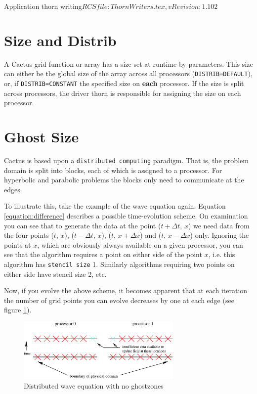 \begin{cactuspart}{2}{Application thorn writing}{$RCSfile: ThornWriters.tex,v $}{$Revision: 1.102 $}
\section{Size and Distrib}

A Cactus grid function or array has a size set at runtime by parameters.
This size can either be the global size of the array across all processors
({\tt DISTRIB=DEFAULT}),
or, if {\tt DISTRIB=CONSTANT} the specified
size on {\bf each} processor.
If the size is split across processors, the driver thorn is
responsible for assigning the size on each processor.

\section{Ghost Size}

Cactus is based upon a {\tt distributed computing} paradigm.  That is,
the problem domain is split into blocks, each of which is assigned to
a processor.  For hyperbolic and parabolic problems the blocks only
need to communicate at the edges.

To illustrate this, take the example of the wave equation again.
Equation \ref{equation:difference} describes a possible time-evolution
scheme.  On examination you can see that to generate the data at the
point ($t+\Delta t$, $x$) we need data from the four points ($t$,
$x$), ($t-\Delta t$, $x$), ($t$, $x+\Delta x$) and ($t$, $x-\Delta x$)
only.  Ignoring the points at $x$, which are obviously always
available on a given processor, you can see that the algorithm
requires a point on either side of the point $x$, i.e. this algorithm
has {\tt stencil size} 1.  Similarly algorithms requiring two points
on either side have stencil size 2, etc.

Now, if you evolve the above scheme, it becomes apparent that at each
iteration the number of grid points you can evolve decreases by one at
each edge (see figure \ref{fig:noghost}).

\begin{figure}[ht]
\begin{center}
\ifpdf
\else
\includegraphics[angle=0,width=8cm]{1dnoghost.eps}
\fi
\end{center}
\caption{Distributed wave equation with no ghostzones}
\label{fig:noghost}
\end{figure}


\end{cactuspart}
